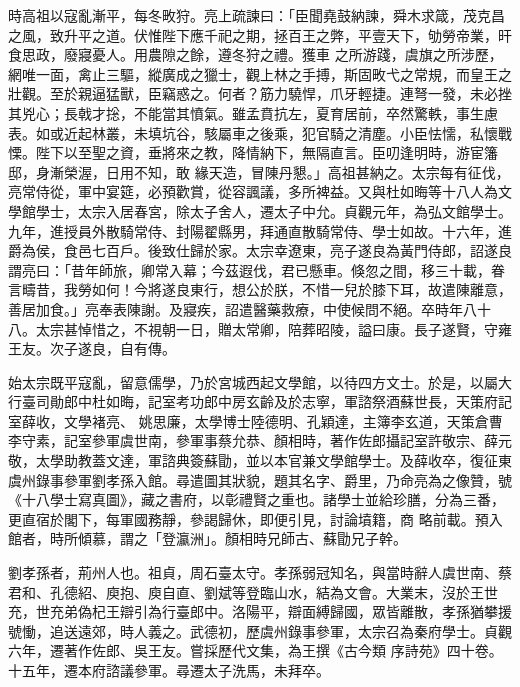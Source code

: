 \begin{pinyinscope}
 時高祖以寇亂漸平，每冬畋狩。亮上疏諫曰：「臣聞堯鼓納諫，舜木求箴，茂克昌之風，致升平之道。伏惟陛下應千祀之期，拯百王之弊，平壹天下，劬勞帝業，旰食思政，廢寢憂人。用農隙之餘，遵冬狩之禮。獲車
 之所游踐，虞旗之所涉歷，網唯一面，禽止三驅，縱廣成之獵士，觀上林之手搏，斯固畋弋之常規，而皇王之壯觀。至於親逼猛獸，臣竊惑之。何者？筋力驍悍，爪牙輕捷。連弩一發，未必挫其兇心；長戟才捴，不能當其憤氣。雖孟賁抗左，夏育居前，卒然驚軼，事生慮表。如或近起林叢，未填坑谷，駭屬車之後乘，犯官騎之清塵。小臣怯懦，私懷戰慄。陛下以至聖之資，垂將來之教，降情納下，無隔直言。臣叨逢明時，游宦籓邸，身漸榮渥，日用不知，敢
 緣天造，冒陳丹懇。」高祖甚納之。太宗每有征伐，亮常侍從，軍中宴筵，必預歡賞，從容諷議，多所裨益。又與杜如晦等十八人為文學館學士，太宗入居春宮，除太子舍人，遷太子中允。貞觀元年，為弘文館學士。九年，進授員外散騎常侍、封陽翟縣男，拜通直散騎常侍、學士如故。十六年，進爵為侯，食邑七百戶。後致仕歸於家。太宗幸遼東，亮子遂良為黃門侍郎，詔遂良謂亮曰：「昔年師旅，卿常入幕；今茲遐伐，君已懸車。倏忽之間，移三十載，眷
 言疇昔，我勞如何！今將遂良東行，想公於朕，不惜一兒於膝下耳，故遣陳離意，善居加食。」亮奉表陳謝。及寢疾，詔遣醫藥救療，中使候問不絕。卒時年八十八。太宗甚悼惜之，不視朝一日，贈太常卿，陪葬昭陵，謚曰康。長子遂賢，守雍王友。次子遂良，自有傳。



 始太宗既平寇亂，留意儒學，乃於宮城西起文學館，以待四方文士。於是，以屬大行臺司勛郎中杜如晦，記室考功郎中房玄齡及於志寧，軍諮祭酒蘇世長，天策府記室薛收，文學褚亮、
 姚思廉，太學博士陸德明、孔穎達，主簿李玄道，天策倉曹李守素，記室參軍虞世南，參軍事蔡允恭、顏相時，著作佐郎攝記室許敬宗、薛元敬，太學助教蓋文達，軍諮典簽蘇勖，並以本官兼文學館學士。及薛收卒，復征東虞州錄事參軍劉孝孫入館。尋遣圖其狀貌，題其名字、爵里，乃命亮為之像贊，號《十八學士寫真圖》，藏之書府，以彰禮賢之重也。諸學士並給珍膳，分為三番，更直宿於閣下，每軍國務靜，參謁歸休，即便引見，討論墳籍，商
 略前載。預入館者，時所傾慕，謂之「登瀛洲」。顏相時兄師古、蘇勖兄子幹。



 劉孝孫者，荊州人也。祖貞，周石臺太守。孝孫弱冠知名，與當時辭人虞世南、蔡君和、孔德紹、庾抱、庾自直、劉斌等登臨山水，結為文會。大業末，沒於王世充，世充弟偽杞王辯引為行臺郎中。洛陽平，辯面縛歸國，眾皆離散，孝孫猶攀援號慟，追送遠郊，時人義之。武德初，歷虞州錄事參軍，太宗召為秦府學士。貞觀六年，遷著作佐郎、吳王友。嘗採歷代文集，為王撰《古今類
 序詩苑》四十卷。十五年，遷本府諮議參軍。尋遷太子洗馬，未拜卒。




\end{pinyinscope}
